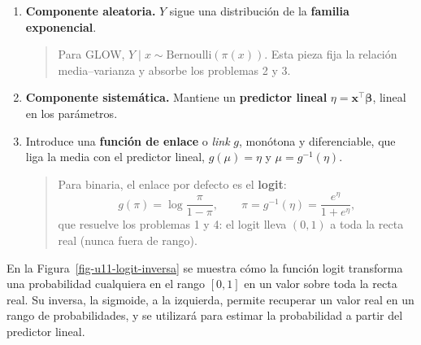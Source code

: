 \documentclass[
  letterpaper,
  DIV=11,
  numbers=noendperiod]{scrartcl}
\begin{document}
\begin{enumerate}
\def\labelenumi{\arabic{enumi}.}
\item
  \textbf{Componente aleatoria.} \(Y\) sigue una distribución de la
  \textbf{familia exponencial}.

  \begin{quote}
  Para GLOW, \(Y\mid x \sim \text{Bernoulli}(\pi(x))\). Esta pieza fija
  la relación media--varianza y absorbe los problemas 2 y 3.
  \end{quote}
\item
  \textbf{Componente sistemática.} Mantiene un \textbf{predictor lineal}
  \(\eta=\mathbf{x}^\top \boldsymbol\beta\), lineal en los parámetros.
\item
  Introduce una \textbf{función de enlace} o \emph{link} \(g\), monótona
  y diferenciable, que liga la media con el predictor lineal,
  \(g(\mu)=\eta\) y \(\mu=g^{-1}(\eta)\).

  \begin{quote}
  Para binaria, el enlace por defecto es el \textbf{logit}: \[
  g(\pi)=\log\frac{\pi}{1-\pi}, \qquad \pi=g^{-1}(\eta)=\frac{e^{\eta}}{1+e^{\eta}},
  \] que resuelve los problemas 1 y 4: el logit lleva \((0,1)\) a toda
  la recta real (nunca fuera de rango).
  \end{quote}
\end{enumerate}

En la Figura~\ref{fig-u11-logit-inversa} se muestra cómo la función
logit transforma una probabilidad cualquiera en el rango \([0,1]\) en un
valor sobre toda la recta real. Su inversa, la sigmoide, a la izquierda,
permite recuperar un valor real en un rango de probabilidades, y se
utilizará para estimar la probabilidad a partir del predictor lineal.
\end{document}
